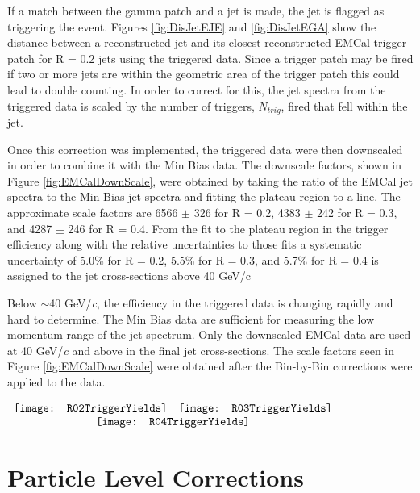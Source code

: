 \noindent
If a match between the gamma patch and a jet is made, the jet is flagged as triggering the event.  Figures \ref{fig:DisJetEJE} and \ref{fig:DisJetEGA} show the distance between a reconstructed jet and its closest reconstructed EMCal trigger patch for R = 0.2 jets using the triggered data.  Since a trigger patch may be fired if two or more jets are within the geometric area of the trigger patch this could lead to double counting.  In order to correct for this, the jet spectra from the triggered data is scaled by the number of triggers, $N_{trig}$, fired that fell within the jet.  

Once this correction was implemented, the triggered data were then downscaled in order to combine it with the Min Bias data.  The downscale factors, shown in Figure \ref{fig:EMCalDownScale}, were obtained by taking the ratio of the EMCal jet spectra to the Min Bias jet spectra and fitting the plateau region to a line.  The approximate scale factors are 6566 $\pm$ 326 for R = 0.2, 4383 $\pm$ 242 for R = 0.3, and 4287 $\pm$ 246 for R = 0.4.  From the fit to the plateau region in the trigger efficiency along with the relative uncertainties to those fits a systematic uncertainty of 5.0\% for R = 0.2, 5.5\% for R = 0.3, and 5.7\% for R = 0.4 is assigned to the jet cross-sections above 40 GeV/c

Below $\sim$40 GeV/\textit{c}, the efficiency in the triggered data is changing rapidly and hard to determine.  The Min Bias data are sufficient for measuring the low momentum range of the jet spectrum.  Only the downscaled EMCal data are used at 40 GeV/\textit{c} and above in the final jet cross-sections.  The scale factors seen in Figure \ref{fig:EMCalDownScale} were obtained after the Bin-by-Bin corrections were applied to the data.


\begin{figure*}[t!]
$\begin{array}{rl}
    \texttt{[image: R02TriggerYields]} &
    \texttt{[image: R03TriggerYields]}\\
    \multicolumn{2}{c}{\texttt{[image: R04TriggerYields]}}
\end{array}$
\caption[EMCal triggered data correction factors for R=0.2, R=0.3, and R=0.4 jets.]{\label{fig:EMCalDownScale}EMCal triggered data correction factors for R=0.2, R=0.3, and R=0.4 jets.}
\end{figure*}
 

\section{Particle Level Corrections}

